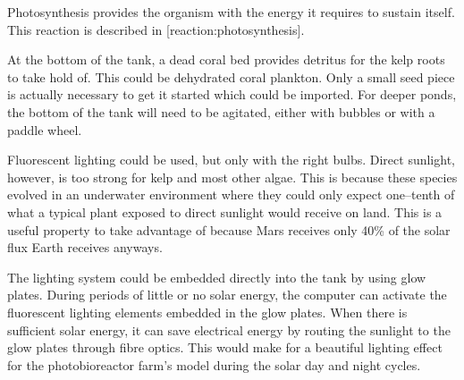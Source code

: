 Photosynthesis provides the organism with the energy it requires to sustain itself. This reaction is described in [reaction:photosynthesis].

\startformula
{}
\stopformula

    {}

At the bottom of the tank, a dead coral bed provides detritus for the kelp roots to take hold of. This could be dehydrated coral plankton. Only a small seed piece is actually necessary to get it started which could be imported. For deeper ponds, the bottom of the tank will need to be agitated, either with bubbles or with a paddle wheel.

Fluorescent lighting could be used, but only with the right bulbs. Direct sunlight, however, is too strong for kelp and most other algae. This is because these species evolved in an underwater environment where they could only expect one--tenth of what a typical plant exposed to direct sunlight would receive on land. This is a useful property to take advantage of because Mars receives only 40\% of the solar flux Earth receives anyways. 

The lighting system could be embedded directly into the tank by using glow plates. During periods of little or no solar energy, the computer can activate the fluorescent lighting elements embedded in the glow plates. When there is sufficient solar energy, it can save electrical energy by routing the sunlight to the glow plates through fibre optics. This would make for a beautiful lighting effect for the photobioreactor farm's model during the solar day and night cycles.

